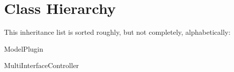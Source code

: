 \section{Class Hierarchy}
This inheritance list is sorted roughly, but not completely, alphabetically\+:\begin{DoxyCompactList}
\item {}
\item Model\+Plugin\begin{DoxyCompactList}
\item {}
\end{DoxyCompactList}
\item Multi\+Interface\+Controller\begin{DoxyCompactList}
\item {}
\end{DoxyCompactList}
\end{DoxyCompactList}
